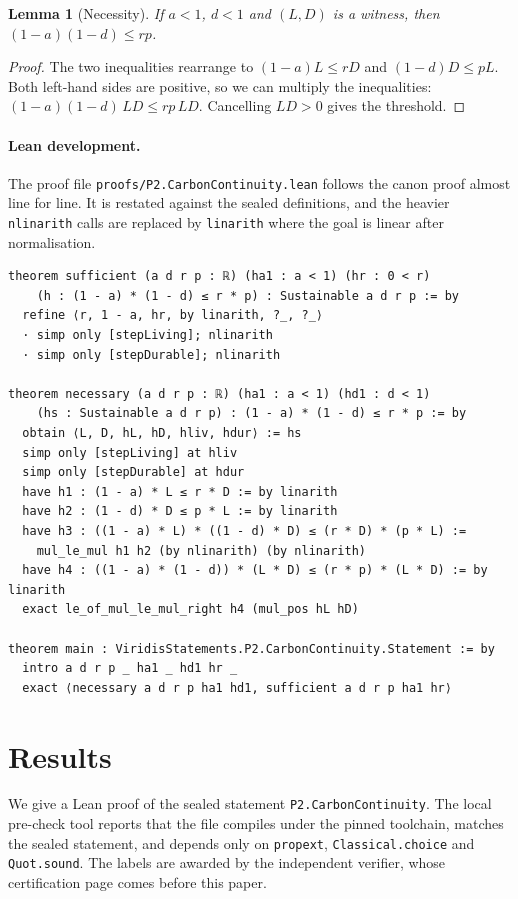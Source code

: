 \documentclass[11pt]{article}
\newtheorem{lemma}[theorem]{Lemma}
\theoremstyle{remark}
\begin{document}
\begin{lemma}[Necessity]
If $a<1$, $d<1$ and $(L,D)$ is a witness, then $(1-a)(1-d)\le rp$.
\end{lemma}
\begin{proof}
The two inequalities rearrange to $(1-a)L\le rD$ and $(1-d)D\le pL$.
Both left-hand sides are positive, so we can multiply the inequalities:
$(1-a)(1-d)\,LD\le rp\,LD$. Cancelling $LD>0$ gives the threshold.
\end{proof}

\paragraph{Lean development.}
The proof file \texttt{proofs/P2.CarbonContinuity.lean} follows the canon proof almost line for line.
It is restated against the sealed definitions, and the heavier \texttt{nlinarith} calls are replaced
by \texttt{linarith} where the goal is linear after normalisation.
\begin{lstlisting}
theorem sufficient (a d r p : ℝ) (ha1 : a < 1) (hr : 0 < r)
    (h : (1 - a) * (1 - d) ≤ r * p) : Sustainable a d r p := by
  refine ⟨r, 1 - a, hr, by linarith, ?_, ?_⟩
  · simp only [stepLiving]; nlinarith
  · simp only [stepDurable]; nlinarith

theorem necessary (a d r p : ℝ) (ha1 : a < 1) (hd1 : d < 1)
    (hs : Sustainable a d r p) : (1 - a) * (1 - d) ≤ r * p := by
  obtain ⟨L, D, hL, hD, hliv, hdur⟩ := hs
  simp only [stepLiving] at hliv
  simp only [stepDurable] at hdur
  have h1 : (1 - a) * L ≤ r * D := by linarith
  have h2 : (1 - d) * D ≤ p * L := by linarith
  have h3 : ((1 - a) * L) * ((1 - d) * D) ≤ (r * D) * (p * L) :=
    mul_le_mul h1 h2 (by nlinarith) (by nlinarith)
  have h4 : ((1 - a) * (1 - d)) * (L * D) ≤ (r * p) * (L * D) := by linarith
  exact le_of_mul_le_mul_right h4 (mul_pos hL hD)

theorem main : ViridisStatements.P2.CarbonContinuity.Statement := by
  intro a d r p _ ha1 _ hd1 hr _
  exact ⟨necessary a d r p ha1 hd1, sufficient a d r p ha1 hr⟩
\end{lstlisting}

\section{Results}
We give a Lean proof of the sealed statement \texttt{P2.CarbonContinuity}.
The local pre-check tool reports that the file compiles under the pinned toolchain,
matches the sealed statement, and depends only on \texttt{propext}, \texttt{Classical.choice} and \texttt{Quot.sound}.
The labels are awarded by the independent verifier, whose certification page comes before this paper.
\end{document}
